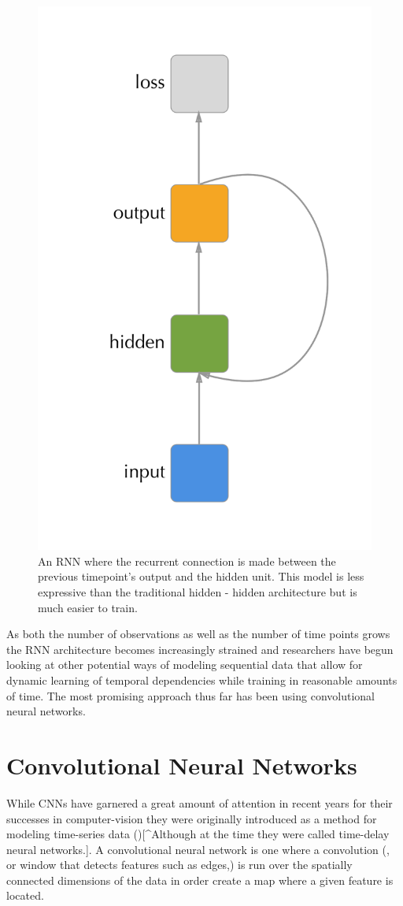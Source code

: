 \documentclass[]{book}
\theoremstyle{definition}
\theoremstyle{definition}
\theoremstyle{definition}
\theoremstyle{remark}
\begin{document}
\begin{figure}

{\centering \includegraphics[width=0.45\linewidth]{figures/output_rnn} 

}

\caption{An RNN where the recurrent connection is made between the previous timepoint's output and the hidden unit. This model is less expressive than the traditional hidden - hidden architecture but is much easier to train.}\label{fig:outputrnn}
\end{figure}

As both the number of observations as well as the number of time points
grows the RNN architecture becomes increasingly strained and researchers
have begun looking at other potential ways of modeling sequential data
that allow for dynamic learning of temporal dependencies while training
in reasonable amounts of time. The most promising approach thus far has
been using convolutional neural networks.

\section{Convolutional Neural
Networks}\label{convolutional-neural-networks}

While CNNs have garnered a great amount of attention in recent years for
their successes in computer-vision they were originally introduced as a
method for modeling time-series data (\citet{hinton_cnn}){[}\^{}Although
at the time they were called time-delay neural networks.{]}. A
convolutional neural network is one where a convolution (, or window
that detects features such as edges,) is run over the spatially
connected dimensions of the data in order create a map where a given
feature is located.
\end{document}
